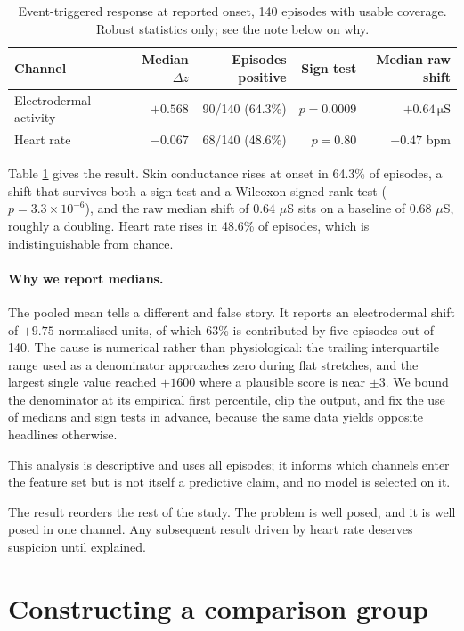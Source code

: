 \documentclass{article}
\begin{document}
\begin{table}[t]
\caption{Event-triggered response at reported onset, 140 episodes with usable
coverage. Robust statistics only; see the note below on why.}
\label{tab:onset}
\centering
\begin{tabular}{lrrrr}
\toprule
Channel & Median $\Delta z$ & Episodes positive & Sign test & Median raw shift \\
\midrule
Electrodermal activity & $+0.568$ & 90/140 (64.3\%) & $p = 0.0009$ &
  $+0.64\,\si{\micro\siemens}$ \\
Heart rate & $-0.067$ & 68/140 (48.6\%) & $p = 0.80$ & $+0.47$ bpm \\
\bottomrule
\end{tabular}
\end{table}

Table \ref{tab:onset} gives the result. Skin conductance rises at onset in
64.3\% of episodes, a shift that survives both a sign test and a
Wilcoxon signed-rank test ($p = 3.3 \times 10^{-6}$), and the raw median shift
of 0.64 $\mu$S sits on a baseline of 0.68 $\mu$S,
roughly a doubling. Heart rate rises in 48.6\% of episodes, which
is indistinguishable from chance.

\paragraph{Why we report medians.} The pooled mean tells a different and false
story. It reports an electrodermal shift of $+9.75$ normalised units, of which
63\% is contributed by five episodes out of 140. The cause is
numerical rather than physiological: the trailing interquartile range used as a
denominator approaches zero during flat stretches, and the largest single value
reached $+1600$ where a plausible score is near $\pm 3$. We bound the
denominator at its empirical first percentile, clip the output, and fix the use
of medians and sign tests in advance, because the same data yields opposite
headlines otherwise.

This analysis is descriptive and uses all episodes; it informs which channels
enter the feature set but is not itself a predictive claim, and no model is
selected on it.

The result reorders the rest of the study. The problem is well posed, and it is
well posed in one channel. Any subsequent result driven by heart rate deserves
suspicion until explained.

\section{Constructing a comparison group}
\label{sec:negatives}
\end{document}
